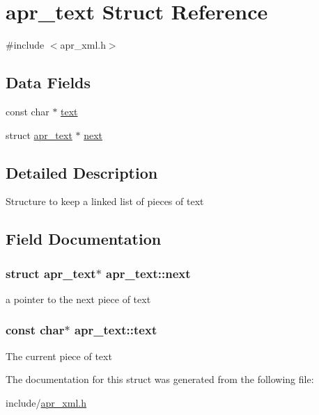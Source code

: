 \hypertarget{structapr__text}{\section{apr\-\_\-text Struct Reference}
\label{structapr__text}
}


{\ttfamily \#include $<$apr\-\_\-xml.\-h$>$}

\subsection*{Data Fields}
\begin{DoxyCompactItemize}
\item 
const char $\ast$ \hyperlink{structapr__text_a37a262695c36f740a7777ea9dd0b699d}{text}
\item 
struct \hyperlink{structapr__text}{apr\-\_\-text} $\ast$ \hyperlink{structapr__text_aaf1b48e3f3085522fe7355e7d8893111}{next}
\end{DoxyCompactItemize}


\subsection{Detailed Description}
Structure to keep a linked list of pieces of text 

\subsection{Field Documentation}
\hypertarget{structapr__text_aaf1b48e3f3085522fe7355e7d8893111}{
\subsubsection[{next}]{\setlength{\rightskip}{0pt plus 5cm}struct {\bf apr\-\_\-text}$\ast$ apr\-\_\-text\-::next}}\label{structapr__text_aaf1b48e3f3085522fe7355e7d8893111}
a pointer to the next piece of text \hypertarget{structapr__text_a37a262695c36f740a7777ea9dd0b699d}{
\subsubsection[{text}]{\setlength{\rightskip}{0pt plus 5cm}const char$\ast$ apr\-\_\-text\-::text}}\label{structapr__text_a37a262695c36f740a7777ea9dd0b699d}
The current piece of text 

The documentation for this struct was generated from the following file\-:\begin{DoxyCompactItemize}
\item 
include/\hyperlink{apr__xml_8h}{apr\-\_\-xml.\-h}\end{DoxyCompactItemize}
